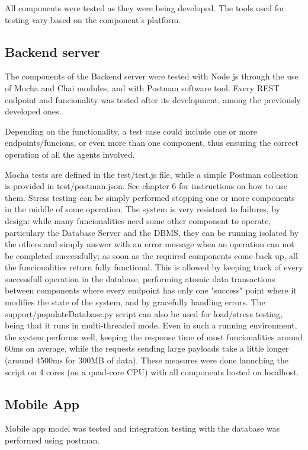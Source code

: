 \documentclass[../main.tex]{subfiles}
\begin{document}
All components were tested as they were being developed. The tools used for testing vary based on the component's platform.

\subsection{Backend server}

The components of the Backend server were tested with Node js through the use of Mocha and Chai modules, and with Postman software tool. Every REST endpoint and funcionality was tested after its development, among the previously developed ones.

Depending on the functionality, a test case could include one or more endpoints/funcions, or even more than one component, thus ensuring the correct operation of all the agents involved.

Mocha tests are defined in the test/test.js file, while a simple Postman collection is provided in test/postman.json. See chapter 6 for instructions on how to use them.
\newline
\newline
Stress testing can be simply performed stopping one or more components in the middle of some operation. The system is very resistant to failures, by design: while many funcionalities need some other component to operate, particulary the Database Server and the DBMS, they can be running isolated by the others and simply answer with an error message when an operation can not be completed successfully; as soon as the required components come back up, all the funcionalities return fully functional. This is allowed by keeping track of every successfull operation in the database, performing atomic data transactions between components where every endpoint has only one "success" point where it modifies the state of the system, and by gracefully handling errors.
\newline
\newline
The support/populateDatabase.py script can also be used for load/stress testing, being that it runs in multi-threaded mode. Even in such a running environment, the system performs well, keeping the response time of most funcionalities around 60ms on average, while the requests sending large payloads take a little longer (around 4500ms for 300MB of data). These measures were done launching the script on 4 cores (on a quad-core CPU) with all components hosted on localhost.

\subsection{Mobile App}

Mobile app model was tested and integration testing with the database was performed using postman. 
\end{document}
